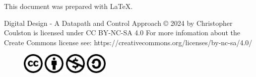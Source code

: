 This document was prepared with \LaTeX.
\vspace{2cm}

Digital Design - A Datapath and Control Approach © 2024 by Christopher Coulston is licensed under CC BY-NC-SA 4.0 
For more infomation about the Create Commons license see: https://creativecommons.org/licenses/by-nc-sa/4.0/

\begin{figure}[h]
\includegraphics[width=1cm]{./Fig/cc-logo.pdf}
\includegraphics[width=1cm]{./Fig/cc-by.pdf}
\includegraphics[width=1cm]{./Fig/cc-nc.pdf}
\includegraphics[width=1cm]{./Fig/cc-sa.pdf}
\end{figure}